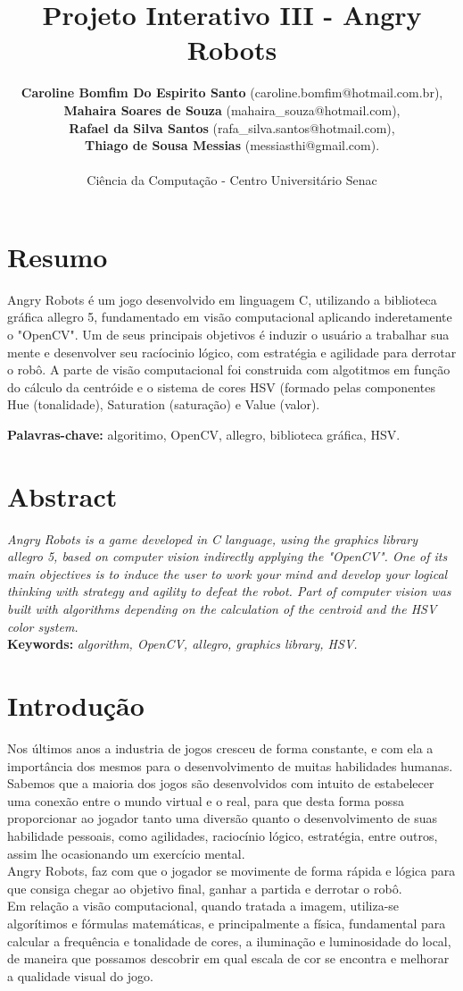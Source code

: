 \documentclass[12pt,openright,twoside,a4paper,brazil]{abntex2}
\title{Projeto Interativo III - Angry Robots}
\date{}
\author{\textbf{Caroline Bomfim Do Espirito Santo} (caroline.bomfim@hotmail.com.br), \\ \textbf{Mahaira Soares de Souza} (mahaira\_souza@hotmail.com), \\ \textbf{Rafael da Silva Santos} (rafa\_silva.santos@hotmail.com), \\ \textbf{Thiago de Sousa Messias} (messiasthi@gmail.com). \\ \\ Ciência da Computação - Centro Universitário Senac}
\begin{document}
\maketitle
 
\section*{Resumo}

Angry Robots é um jogo desenvolvido em linguagem C, utilizando a biblioteca gráfica allegro 5, fundamentado em visão computacional aplicando inderetamente o "OpenCV". Um de seus principais objetivos é induzir o usuário a trabalhar sua mente e desenvolver seu racíocinio lógico, com estratégia e agilidade para derrotar o robô. A parte de visão computacional foi construida com algotitmos em função do cálculo da centróide e o sistema de cores HSV (formado pelas componentes Hue (tonalidade), Saturation (saturação) e Value (valor).

\textbf{Palavras-chave:} algoritimo, OpenCV, allegro, biblioteca gráfica, HSV.

\section*{Abstract}

\textit{Angry Robots is a game developed in C language, using the graphics library allegro 5, based on computer vision indirectly applying the "OpenCV". One of its main objectives is to induce the user to work your mind and develop your logical thinking with strategy and agility to defeat the robot. Part of computer vision was built with algorithms depending on the calculation of the centroid and the HSV color system.} \\

\textbf{Keywords:}\textit{ algorithm, OpenCV, allegro, graphics library, HSV.} 

\section*{Introdução}

Nos últimos anos a industria de jogos cresceu de forma constante, e com ela a importância dos mesmos para o desenvolvimento de muitas habilidades humanas. Sabemos que a maioria dos jogos são desenvolvidos com intuito de estabelecer uma conexão entre o mundo virtual e o real, para que desta forma possa proporcionar ao jogador tanto uma diversão quanto o desenvolvimento de suas habilidade pessoais, como agilidades, raciocínio lógico, estratégia, entre outros, assim lhe ocasionando um exercício mental. \\
Angry Robots, faz com que o jogador se movimente de forma rápida e lógica para que consiga chegar ao objetivo final, ganhar a partida e derrotar o robô. \\
Em relação a visão computacional, quando tratada a imagem, utiliza-se algorítimos e fórmulas matemáticas, e principalmente a física, fundamental para calcular a frequência e tonalidade de cores, a iluminação e luminosidade do local, de maneira que possamos descobrir em qual escala de cor se encontra e melhorar a qualidade visual do jogo.
\end{document}
